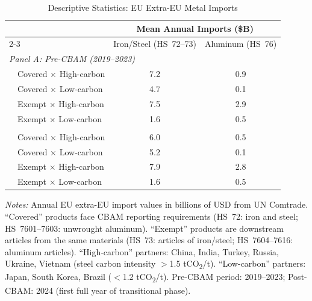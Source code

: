 \begin{table}[htbp]
\centering
\caption{Descriptive Statistics: EU Extra-EU Metal Imports}
\label{tab:descriptive}
\begin{threeparttable}
\begin{tabular}{lcc}
\hline\hline
 & \multicolumn{2}{c}{Mean Annual Imports (\$B)} \\
\cmidrule(lr){2-3}
 & Iron/Steel (HS~72--73) & Aluminum (HS~76) \\
\hline
\multicolumn{3}{l}{\textit{Panel A: Pre-CBAM (2019--2023)}} \\
\addlinespace[3pt]
~~Covered $\times$ High-carbon & 7.2 & 0.9 \\
~~Covered $\times$ Low-carbon & 4.7 & 0.1 \\
~~Exempt $\times$ High-carbon & 7.5 & 2.9 \\
~~Exempt $\times$ Low-carbon & 1.6 & 0.5 \\
\addlinespace[6pt]
\multicolumn{3}{l}{\textit{Panel B: Post-CBAM (2024)}} \\
\addlinespace[3pt]
~~Covered $\times$ High-carbon & 6.0 & 0.5 \\
~~Covered $\times$ Low-carbon & 5.2 & 0.1 \\
~~Exempt $\times$ High-carbon & 7.9 & 2.8 \\
~~Exempt $\times$ Low-carbon & 1.6 & 0.5 \\
\hline\hline
\end{tabular}
\begin{tablenotes}[flushleft]\footnotesize
\item \textit{Notes:} Annual EU extra-EU import values in billions of USD from UN Comtrade. ``Covered'' products face CBAM reporting requirements (HS~72: iron and steel; HS~7601--7603: unwrought aluminum). ``Exempt'' products are downstream articles from the same materials (HS~73: articles of iron/steel; HS~7604--7616: aluminum articles). ``High-carbon'' partners: China, India, Turkey, Russia, Ukraine, Vietnam (steel carbon intensity $>$1.5 tCO\textsubscript{2}/t). ``Low-carbon'' partners: Japan, South Korea, Brazil ($<$1.2 tCO\textsubscript{2}/t). Pre-CBAM period: 2019--2023; Post-CBAM: 2024 (first full year of transitional phase).
\end{tablenotes}
\end{threeparttable}
\end{table}

